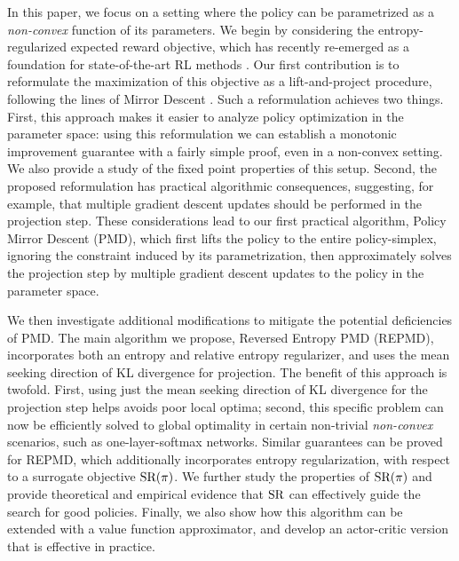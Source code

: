 In this paper, we focus on a setting where the policy can be
parametrized as a \emph{non-convex} function of its parameters.
We begin by considering the entropy-regularized expected reward objective,
which has recently re-emerged as a foundation for state-of-the-art RL methods
\citep{williams1991function,fox2015taming,schulman2017equivalence,nachum2017bridging,haarnoja2017reinforcement}. 
Our first contribution is to reformulate the maximization of 
this objective as a lift-and-project procedure,
following the lines of Mirror Descent
\citep{nemirovskii1983problem,beck2003mirror}.
Such a reformulation achieves two things.
First, this approach makes it easier to analyze policy optimization
in the parameter space:
using this reformulation we can establish a monotonic improvement guarantee
with a fairly simple proof,
even in a non-convex setting.
We also provide a study of the fixed point properties of this setup.
Second, the proposed reformulation has practical algorithmic consequences,
suggesting, for example,
that multiple gradient descent updates should be performed
in the projection step.
These considerations lead to our first practical algorithm,
Policy Mirror Descent (PMD),
which first lifts the policy to the entire policy-simplex,
ignoring the constraint induced by its parametrization,
then approximately solves the projection step by multiple
gradient descent updates to the policy in the parameter space. 
%
%

We then investigate
additional modifications to mitigate the potential deficiencies of PMD.
The main algorithm we propose, Reversed Entropy PMD (REPMD),
incorporates both an entropy and relative entropy regularizer,
and uses the mean seeking direction of KL divergence for projection.
The benefit of this approach is twofold.
First, 
using just the mean seeking direction of KL divergence for the projection step
helps avoids poor local optima;
second,
this specific problem can now be efficiently solved to global optimality
in certain non-trivial \emph{non-convex} scenarios,
such as one-layer-softmax networks.
Similar guarantees can be proved for REPMD,
which additionally incorporates entropy regularization,
with respect to a surrogate objective $\text{SR}(\pi)$.
We further study the properties of $\text{SR}(\pi)$ and provide theoretical
and empirical evidence that $\text{SR}$ 
can effectively guide the search for good policies.
Finally, we also show how this algorithm can be extended 
with a value function approximator,
and develop an actor-critic version that is effective in practice.



